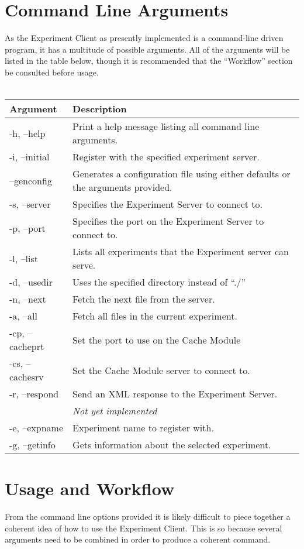 \documentclass[letterpaper]{article}
\begin{document}
\section{Command Line Arguments}
As the Experiment Client as presently implemented is a command-line driven program, it has a multitude of possible arguments. All of the arguments will be listed in the table below, though it is recommended that the ``Workflow'' section be consulted before usage.
\\
\\
\begin{tabular}{|l|l|}
\hline
\textbf{Argument} & \textbf{Description}\\
\hline
\hline
-h, --help & Print a help message listing all command line arguments.\\
\hline
-i, --initial & Register with the specified experiment server.\\
\hline
--genconfig & Generates a configuration file using either defaults or the arguments provided.\\
\hline
-s, --server & Specifies the Experiment Server to connect to.\\
\hline
-p, --port & Specifies the port on the Experiment Server to connect to.\\
\hline
-l, --list & Lists all experiments that the Experiment server can serve.\\
\hline
-d, --usedir & Uses the specified directory instead of ``./''\\
\hline
-n, --next & Fetch the next file from the server.\\
\hline
-a, --all & Fetch all files in the current experiment.\\
\hline
-cp, --cacheprt & Set the port to use on the Cache Module\\
\hline
-cs, --cachesrv & Set the Cache Module server to connect to.\\
\hline
-r, --respond & Send an XML response to the Experiment Server.\\
              & \textit{Not yet implemented}\\
\hline
-e, --expname & Experiment name to register with.\\
\hline
-g, --getinfo & Gets information about the selected experiment.\\
\hline
\end{tabular}

\section{Usage and Workflow}
From the command line options provided it is likely difficult to piece together a coherent idea of how to use the Experiment Client. This is so because several arguments need to be combined in order to produce a coherent command.
\end{document}
